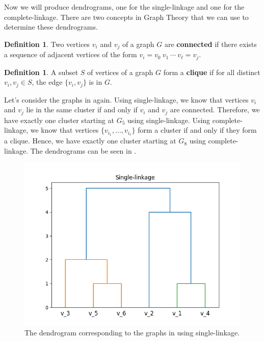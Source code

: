 \documentclass[a4paper, 12pt]{article}
\numberwithin{equation}{section}
\numberwithin{figure}{section}
\theoremstyle{definition}
\newtheorem{defn}[thm]{Definition}
\begin{document}
Now we will produce dendrograms, one for the single-linkage and one for the
complete-linkage. There are two concepts in Graph Theory that we can use to
determine these dendrograms. 

\begin{defn}
	Two vertices $v_i$ and $v_j$ of a graph $G$ are \textbf{connected} if there
	exists a sequence of adjacent vertices of the form $v_i = v_0 ~ v_1 ~ \cdots
	~ v_{\ell} = v_j$.
\end{defn}

\begin{defn}
	A subset $S$ of vertices of a graph $G$ form a \textbf{clique} if for all
	distinct $v_i, v_j\in S$, the edge $\{v_i, v_j\}$ is in $G$. 
\end{defn}

Let's consider the graphs in  again. Using single-linkage, we
know that vertices $v_i$ and $v_j$ lie in the same cluster if and only if $v_i$
and $v_j$ are connected. Therefore, we have exactly one cluster starting at
$G_5$ using single-linkage. Using complete-linkage, we know that vertices
$\{v_{i_1}, \dots, v_{i_{\ell}}\}$ form a cluster if and only if they form a
clique. Hence, we have exactly one cluster starting at $G_8$ using
complete-linkage. The dendrograms can be seen in
. 

\afterpage{\clearpage}

\begin{figure}[h]
	\centering 
	\includegraphics[scale=0.75]{graphics/slink.png}
	\caption{The dendrogram corresponding to the graphs in  using single-linkage.}
	\label{fig:dendrogram-slink}	
\end{figure}
\end{document}

